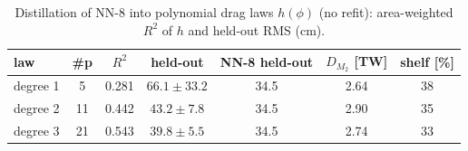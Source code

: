 \begin{table}[t]\centering\footnotesize
\caption{Distillation of NN-8 into polynomial drag laws $h(\phi)$ (no refit): area-weighted $R^2$ of $h$ and held-out RMS (cm).}
\label{tab:distill}
\begin{tabular}{lcccccc}
\toprule
law & \#p & $R^2$ & held-out & NN-8 held-out & $D_{M_2}$ [TW] & shelf [\%] \\
\midrule
degree 1 & 5 & 0.281 & $66.1\pm33.2$ & 34.5 & 2.64 & 38 \\
degree 2 & 11 & 0.442 & $43.2\pm7.8$ & 34.5 & 2.90 & 35 \\
degree 3 & 21 & 0.543 & $39.8\pm5.5$ & 34.5 & 2.74 & 33 \\
\bottomrule
\end{tabular}
\end{table}
